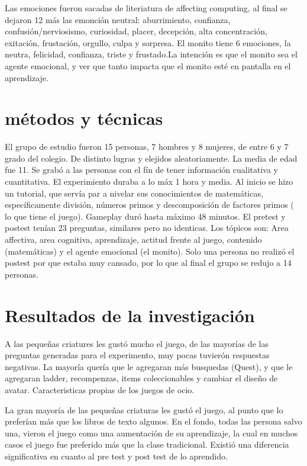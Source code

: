 \documentclass{book}
\begin{document}
    Las emociones fueron sacadas de literiatura de affecting computing, al final se dejaron 12 más las emonción neutral: aburrimiento, confianza, confusión/nerviosismo, curiosidad, placer, decepción, alta concentración, exitación, frustación, orgullo, culpa y sorpresa. El monito tiene 6 emociones, la neutra, felicidad, confianza, triste y frustado.La intención es que el monito sea el agente emocional, y ver que tanto impacta que el monito esté en pantalla en el aprendizaje.  
\newline
\newline


\section{métodos y técnicas}
    El grupo de estudio fueron 15 personas, 7 hombres y 8 mujeres, de entre 6 y 7 grado del colegio. De distinto lugras y elejidos aleatoriamente. La media de edad fue 11. Se grabó a las personas con el fín de tener información cualitativa y cuantitativa. El experimiento duraba a lo máx 1 hora y media. Al inicio se hizo un tutorial, que servía par a nivelar sus conocimientos de matemáticas, específicamente división, números primos y descomposición de factores primos ( lo que tiene el juego). Gameplay duró hasta máximo 48 minutos.
\newline
\newline
    El pretest y postest tenían 23 preguntas, similares pero no identicas. Los tópicos son: Area affectiva, area cognitiva, aprendizaje, actitud frente al juego, contenido (matemáticas) y el agente emocional (el monito). Solo una persona no realizó el postest por que estaba muy cansado, por lo que al final el grupo se redujo a 14 personas.


\section{Resultados de la investigación}
    A las pequeñas criatures les gustó mucho el juego, de las mayorías de las preguntas generadas para el experimento, muy pocas tuvierón respuestas negativas. La mayoría quería que le agregaran más busquedas (Quest), y que le agregaran ladder, recompenzas, items coleccionables y cambiar el diseño de avatar. Caracteristicas propias de los juegos de ocio. 
\newline
\newline


    La gran mayoría de las pequeñas criaturas les gustó el juego, al punto que lo preferían más que los libros de texto algunos. En el fondo, todas las persona salvo una, vieron el juego como una aumentación de su aprendizaje, la cual en muchos casos el juego fue preferido más que la clase tradicional. Existió una diferencia significativa en cuanto al pre test y post test de lo aprendido.
\newline
\newline
\end{document}
